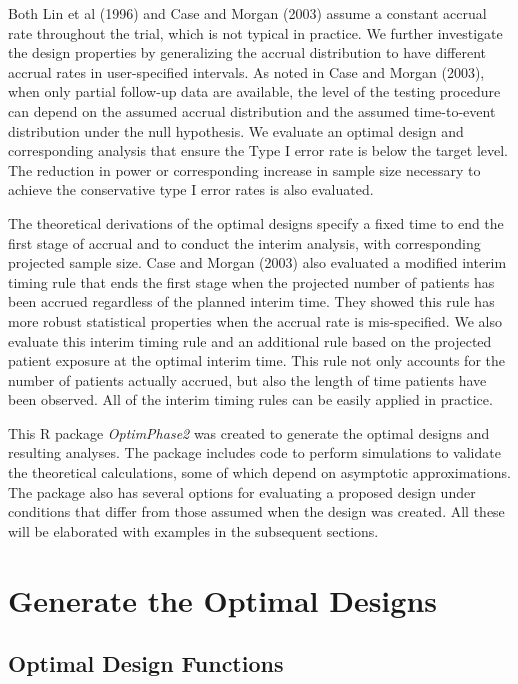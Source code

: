 \documentclass[12pt]{article}
\begin{document}
Both Lin et al (1996) and Case and Morgan (2003) assume a constant accrual rate throughout the
trial, which is not typical in practice. We further investigate the design properties by
generalizing the accrual distribution to have different accrual rates in user-specified intervals.
As noted in Case and Morgan (2003), when only partial follow-up data are available, the level of
the testing procedure can depend on the assumed accrual distribution and the assumed time-to-event
distribution under the null hypothesis.  We evaluate an optimal design and corresponding analysis
that ensure the Type I error rate is below the target level.  The reduction in power or
corresponding increase in sample size necessary to achieve the conservative type I error rates is
also evaluated.

The theoretical derivations of the optimal designs specify a fixed time to end the first stage of
accrual and to conduct the interim analysis, with corresponding projected sample size. Case and
Morgan (2003) also evaluated a modified interim timing rule that ends the first stage when the
projected number of patients has been accrued regardless of the planned interim time. They showed
this rule has more robust statistical properties when the accrual rate is mis-specified.  We also
evaluate this interim timing rule and an additional rule based on the projected patient exposure at
the optimal interim time. This rule not only accounts for the number of patients actually accrued,
but also the length of time patients have been observed. All of the interim timing rules can be
easily applied in practice.

This R package {\it OptimPhase2} was created to generate the optimal designs and resulting analyses. The package
includes code to perform simulations to validate the theoretical calculations, some of which depend
on asymptotic approximations.  The package also has several options for evaluating a proposed
design under conditions that differ from those assumed when the design was created. All these will be
elaborated with examples in the subsequent sections.

\section{Generate the Optimal Designs}
\label{OptimDes}
\subsection{Optimal Design Functions}
\end{document}

